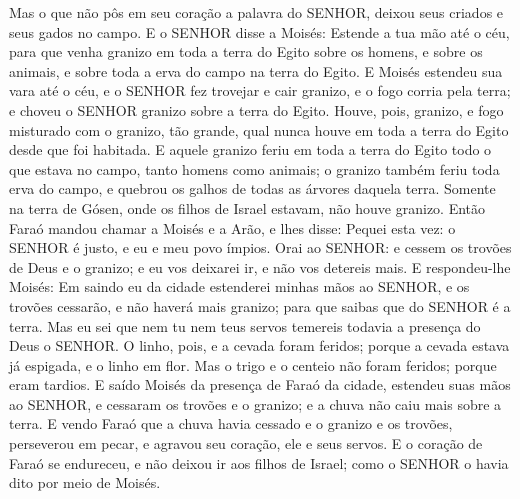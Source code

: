 {Mas o que não pôs em seu coração a palavra do SENHOR, deixou seus criados e seus gados no campo.
E o SENHOR disse a Moisés: Estende a tua mão até o céu, para que venha granizo em toda a terra do Egito sobre os homens, e sobre os animais, e sobre toda a erva do campo na terra do Egito.
E Moisés estendeu sua vara até o céu, e o SENHOR fez trovejar e cair granizo, e o fogo corria pela terra; e choveu o SENHOR granizo sobre a terra do Egito.
Houve, pois, granizo, e fogo misturado com o granizo, tão grande, qual nunca houve em toda a terra do Egito desde que foi habitada.
E aquele granizo feriu em toda a terra do Egito todo o que estava no campo, tanto homens como animais; o granizo também feriu toda erva do campo, e quebrou os galhos de todas as árvores daquela terra.
Somente na terra de Gósen, onde os filhos de Israel estavam, não houve granizo.
Então Faraó mandou chamar a Moisés e a Arão, e lhes disse: Pequei esta vez: o SENHOR é justo, e eu e meu povo ímpios.
Orai ao SENHOR: e cessem os trovões de Deus e o granizo; e eu vos deixarei ir, e não vos detereis mais.
E respondeu-lhe Moisés: Em saindo eu da cidade estenderei minhas mãos ao SENHOR, e os trovões cessarão, e não haverá mais granizo; para que saibas que do SENHOR é a terra.
Mas eu sei que nem tu nem teus servos temereis todavia a presença do Deus o SENHOR.
O linho, pois, e a cevada foram feridos; porque a cevada estava já espigada, e o linho em flor.
Mas o trigo e o centeio não foram feridos; porque eram tardios.
E saído Moisés da presença de Faraó da cidade, estendeu suas mãos ao SENHOR, e cessaram os trovões e o granizo; e a chuva não caiu mais sobre a terra.
E vendo Faraó que a chuva havia cessado e o granizo e os trovões, perseverou em pecar, e agravou seu coração, ele e seus servos.
E o coração de Faraó se endureceu, e não deixou ir aos filhos de Israel; como o SENHOR o havia dito por meio de Moisés.

}
